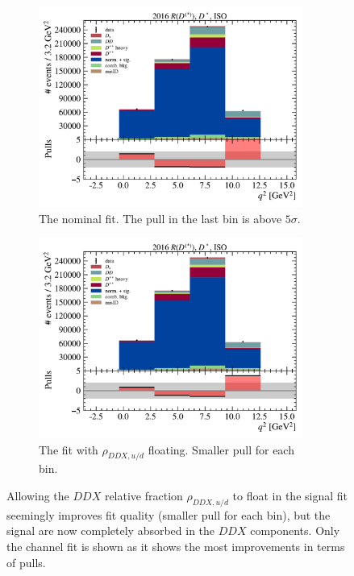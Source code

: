 \begin{figure}[!htb]
    \begin{subfigure}[t]{0.48\textwidth}
        \includegraphics[width=0.95\textwidth]{figs-fit/fit_uvsd/fit_result-stacked-Dst-iso-q2.pdf}
        \caption{
            The nominal fit.
            The pull in the last \qSq bin is above $5 \sigma$.
        }
    \end{subfigure}%
    \hfill%
    \begin{subfigure}[t]{0.48\textwidth}
        \includegraphics[width=0.95\textwidth]{figs-fit/fit_uvsd/fit_result-stacked-Dst-iso-q2-floating_uvsd.pdf}
        \caption{
            The fit with $\rho_{DDX,u/d}$ floating.
            Smaller pull for each \qSq bin.
        }
    \end{subfigure}

    \caption{
        Allowing the $DDX$ relative fraction $\rho_{DDX,u/d}$ to float in the
        signal fit seemingly improves fit quality
        (smaller pull for each \qSq bin),
        but the signal are now completely absorbed in the $DDX$ components.
        Only the \Dstar channel fit is shown as it shows the most improvements
        in terms of pulls.
    }
    \label{fig:fit-float-uvsd}
\end{figure}


